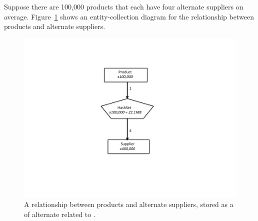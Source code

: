 Suppose there are 100,000 products that each have four alternate suppliers on
average. Figure~\ref{fig:product-hashset} shows an entity-collection diagram for
the relationship between products and alternate suppliers.
 \begin{figure}
  \centering
 \includegraphics[width=.80\textwidth]{part1/Figures/collections/product-hashset.pdf}
 \caption{A relationship between products and alternate suppliers,
  stored as a
   of alternate  related to .}
  \label{fig:product-hashset}
\end{figure}


